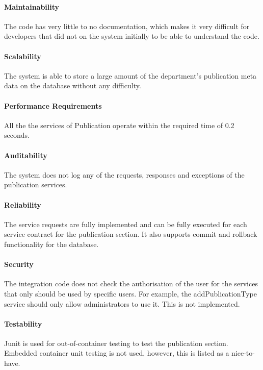 \documentclass{article}
\begin{document}
            \paragraph{Maintainability}
            The code has very little to no documentation, which makes it very difficult for developers that did not on the system initially to be able to understand the code.
            
            \paragraph{Scalability}
            The system is able to store a large amount of the department's publication meta data on the database without any difficulty.
            
            \paragraph{Performance Requirements}
            All the the services of Publication operate within the required time of 0.2 seconds.
            
            \paragraph{Auditability}
            The system does not log any of the requests, responses and exceptions of the publication services.
            
            
            \paragraph{Reliability}
            The service requests are fully implemented and can be fully executed for each service contract for the publication section. It also supports commit and rollback functionality for the database.
            
            \paragraph{Security}
            The integration code does not check the authorisation of the user for the services that only should be used by specific users. For example, the addPublicationType service should only allow administrators to use it. This is not implemented.
            
            \paragraph{Testability}
            Junit is used for out-of-container testing to test the publication section. Embedded container unit testing is not used, however, this is listed as a nice-to-have.
\end{document}
